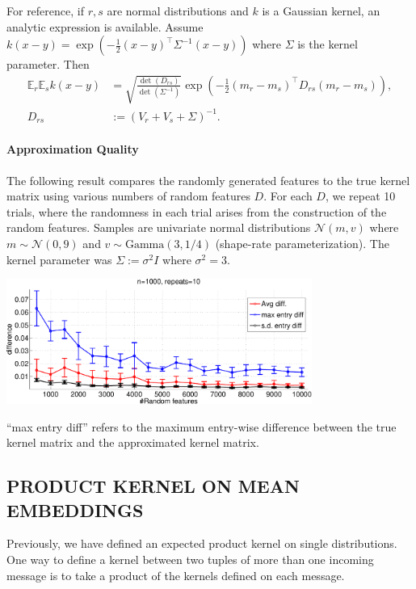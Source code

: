 \documentclass[english]{article}
\theoremstyle{plain}
\theoremstyle{plain}
\begin{document}
For reference, if $r, s$ are normal distributions and $k$
is a Gaussian kernel, an analytic expression is available. Assume
$k(x-y)=\exp\left(-\frac{1}{2}\left(x-y\right)^{\top}\Sigma^{-1}\left(x-y\right)\right)$
where $\Sigma$ is the kernel parameter. Then
\begin{align*}
\mathbb{E}_{r}\mathbb{E}_{s}k(x-y) & =\sqrt{\frac{\det(D_{rs})}{\det(\Sigma^{-1})}}\exp\left(-\frac{1}{2}\left(m_{r}-m_{s}\right)^{\top}D_{rs}\left(m_{r}-m_{s}\right)\right),\\
D_{rs} & :=\left(V_{r}+V_{s}+\Sigma\right)^{-1}.
\end{align*}

\paragraph{Approximation Quality}

{} The following result compares the randomly generated features to
the true kernel matrix using various numbers of random features $D$. 
For each $D$, we repeat 10 trials, where the randomness in each trial 
arises from the construction of the random features. 
Samples are univariate normal distributions $\mathcal{N}(m, v)$ where 
$m \sim \mathcal{N}(0, 9)$ and $v \sim \text{Gamma}(3, 1/4)$ (shape-rate 
parameterization). The kernel parameter was $\Sigma:=\sigma^2 I$ where $\sigma^2=3$.

\begin{center}
\includegraphics[width=10cm]{img/primal_egauss_sanity-crop}
\end{center}

``max entry diff''
refers to the maximum entry-wise difference between the true kernel
matrix and the approximated kernel matrix.

\subsection{PRODUCT KERNEL ON MEAN EMBEDDINGS}
Previously, we have defined an expected product kernel on single distributions.
One way to define a kernel between two tuples of more than one incoming message is to take 
a product of the kernels defined on each message.
\end{document}
